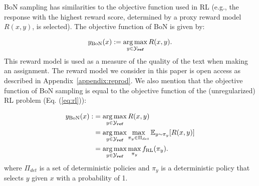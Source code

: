 BoN sampling has similarities to the objective function used in RL (e.g., the response with the highest reward score, determined by a proxy reward model $R(x,y)$, is selected). The objective function of BoN is given by:

\begin{equation*}
y_{\mathrm{BoN}}(x) := \underset{y \in \mathcal{Y}_{\textbf{ref}}}{\operatorname*{arg\,max}}\, R(x, y).
\end{equation*}
This reward model is used as a measure of the quality of the text when making an assignment. The reward model we consider in this paper is open access as described in Appendix~\ref{appendix:reprod}.
We also mention that the objective function of BoN sampling is equal to the objective function of the (unregularized) RL problem (Eq. (\ref{eq:rl})):

\begin{equation}\label{eq:bon}
\begin{aligned}
y_{\mathrm{BoN}}(x) :&= \underset{y \in \mathcal{Y}_{\textbf{ref}}}{\operatorname*{arg\,max}}\, R(x, y) \\
     &= \underset{y \in \mathcal{Y}_{\textbf{ref}}}{\operatorname*{arg\,max}}\max_{\pi_y \in \Pi_{det}} \mathbb{E}_{y \sim \pi_y}[R(x,y)] \\
    &= \underset{y \in \mathcal{Y}_{\textbf{ref}}}{\operatorname*{arg\,max}}\max_{\pi_y} f_\mathrm{RL}(\pi_y).
\end{aligned}
\end{equation}
where $\Pi_{det}$ is a set of deterministic policies and $\pi_y$ is a deterministic policy that selects $y$ given $x$ with a probability of 1.


